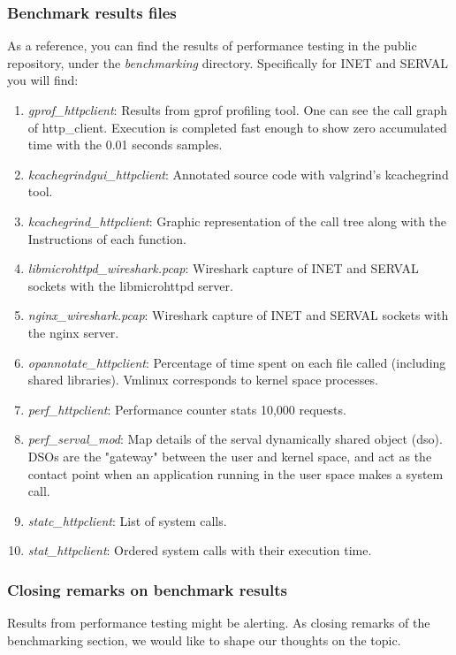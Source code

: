 \subsubsection{Benchmark results files}
As a reference, you can find the results of performance testing in the public repository, under the \emph{benchmarking} directory.
Specifically for INET and SERVAL you will find:
\begin{enumerate}
  \item \emph{gprof\_httpclient}: Results from gprof profiling tool. One can see the call graph of http\_client. Execution is completed fast enough to show zero accumulated time with the 0.01 seconds samples.
  \item \emph{kcachegrindgui\_httpclient}: Annotated source code with valgrind's kcachegrind tool.
  \item \emph{kcachegrind\_httpclient}: Graphic representation of the call tree along with the Instructions of each function.
  \item \emph{libmicrohttpd\_wireshark.pcap}: Wireshark capture of INET and SERVAL sockets with the libmicrohttpd server.
  \item \emph{nginx\_wireshark.pcap}: Wireshark capture of INET and SERVAL sockets with the nginx server.
  \item \emph{opannotate\_httpclient}: Percentage of time spent on each file called (including shared libraries). Vmlinux corresponds to kernel space processes.
  \item \emph{perf\_httpclient}: Performance counter stats 10,000 requests.
  \item \emph{perf\_serval\_mod}: Map details of the serval dynamically shared object (dso). DSOs are the "gateway" between the user and kernel space, and act as the contact point when an application running in the user space makes a system call.
  \item \emph{statc\_httpclient}: List of system calls.
  \item \emph{stat\_httpclient}: Ordered system calls with their execution time.
\end{enumerate}



\newpage
\subsubsection{Closing remarks on benchmark results}
Results from performance testing might be alerting.
As closing remarks of the benchmarking section, we would like to shape our thoughts on the topic.

